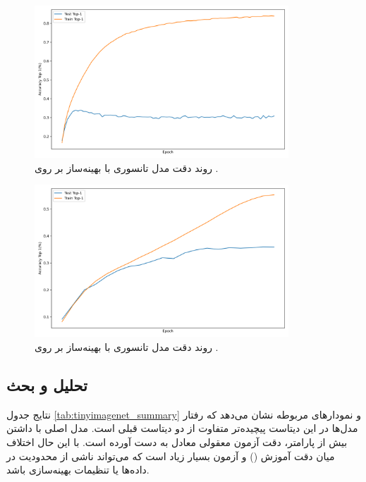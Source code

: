 \begin{figure}[ht]
	\centering
	\includegraphics[width=0.85\textwidth]{transformer_images/results/tiny_image_net_tensorized_2.png}
	\caption{روند دقت  مدل تانسوری با بهینه‌ساز  بر روی .}
	\label{fig:tiny_tensor_adam}
\end{figure}

\begin{figure}[ht]
	\centering
	\includegraphics[width=0.85\textwidth]{transformer_images/results/tiny_image_net_tensorized.png}
	\caption{روند دقت  مدل تانسوری با بهینه‌ساز  بر روی .}
	\label{fig:tiny_tensor_adamw}
\end{figure}

\subsection{تحلیل و بحث}

نتایج جدول \ref{tab:tinyimagenet_summary} و نمودارهای مربوطه نشان می‌دهد که رفتار مدل‌ها در این دیتاست پیچیده‌تر متفاوت از دو دیتاست قبلی است. مدل اصلی  با داشتن بیش از  پارامتر، دقت آزمون  معقولی معادل  به دست آورده است. با این حال اختلاف میان دقت آموزش () و آزمون بسیار زیاد است که می‌تواند ناشی از محدودیت در داده‌ها یا تنظیمات بهینه‌سازی باشد.  

